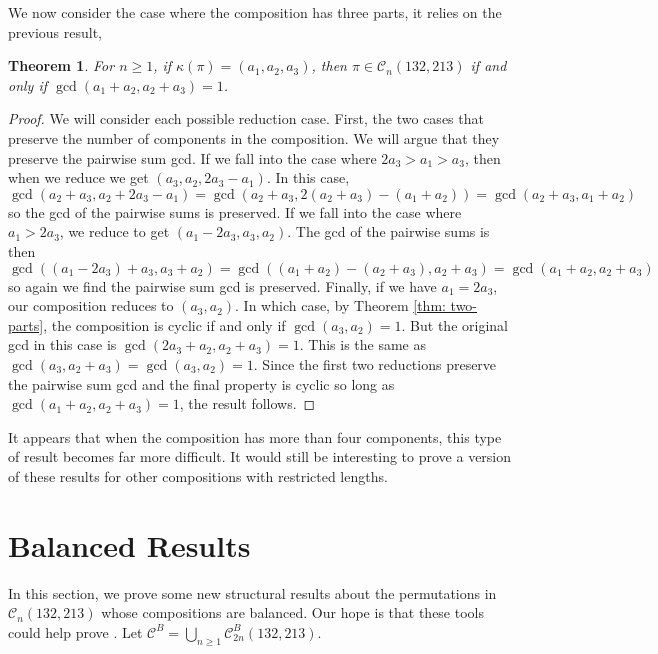 \documentclass[11pt]{article}
\newcommand\C{\mathcal C}
\newtheorem{theorem}{Theorem}[section]
\theoremstyle{definition}
\begin{document}
We now consider the case where the composition has three parts, it relies on the previous result,

\begin{theorem}
    For $n \ge 1$, if $\kappa(\pi) = (a_1,a_2,a_3)$, then $\pi \in \C_n(132,213)$ if and only if $\gcd(a_1+a_2,a_2+a_3) = 1$.
\end{theorem}

\begin{proof}
   We will consider each possible reduction case. First, the two cases that preserve the number of components in the composition. We will argue that they preserve the pairwise sum gcd. If we fall into the case where $2a_3 > a_1 > a_3$, then when we reduce we get $(a_3,a_2,2a_3-a_1)$. In this case, 
   \[
   \gcd(a_2+a_3,a_2 + 2a_3-a_1) = \gcd(a_2+a_3,2(a_2+a_3)-(a_1+a_2))= \gcd(a_2+a_3, a_1+a_2)
   \]
   so the gcd of the pairwise sums is preserved. If we fall into the case where $a_1 > 2a_3$, we reduce to get $(a_1-2a_3,a_3,a_2)$. The gcd of the pairwise sums is then
   \[
   \gcd((a_1-2a_3)+a_3,a_3+a_2)=\gcd((a_1+a_2)-(a_2+a_3),a_2+a_3) = \gcd(a_1+a_2, a_2+a_3)
   \]
   so again we find the pairwise sum gcd is preserved. Finally, if we have $a_1 = 2a_3$, our composition reduces to $(a_3,a_2)$. In which case, by Theorem \ref{thm: two-parts}, the composition is cyclic if and only if $\gcd(a_3,a_2) = 1$. But the original gcd in this case is $\gcd(2a_3+a_2,a_2+a_3) = 1$. This is the same as $\gcd(a_3,a_2+a_3) = \gcd(a_3,a_2) = 1$. Since the first two reductions preserve the pairwise sum gcd and the final property is cyclic so long as $\gcd(a_1+a_2,a_2+a_3) = 1$, the result follows.
\end{proof}

It appears that when the composition has more than four components, this type of result becomes far more difficult. It would still be interesting to prove a version of these results for other compositions with restricted lengths.

\section{Balanced Results} \label{sec: balanced}

In this section, we prove some new structural results about the permutations in $\C_n(132,213)$ whose compositions are balanced. Our hope is that these tools could help prove \cite[Conjecture 5.1]{H19}. Let $\C^B = \bigcup_{n \geq 1} \C_{2n}^B(132,213)$.
\end{document}
